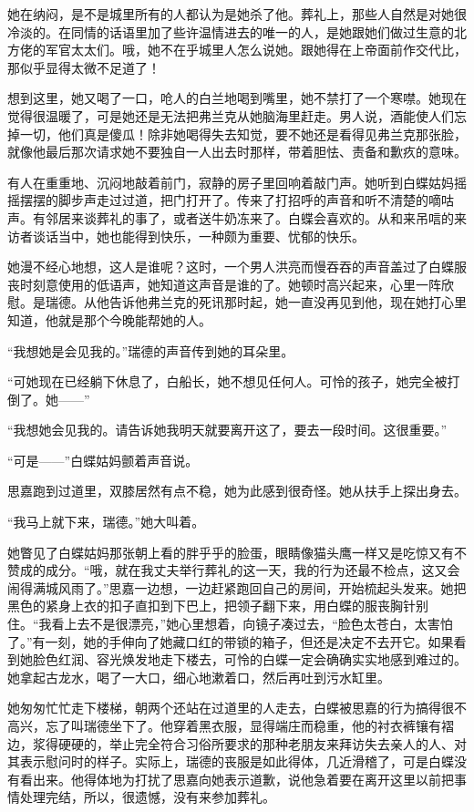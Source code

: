 \par 她在纳闷，是不是城里所有的人都认为是她杀了他。葬礼上，那些人自然是对她很冷淡的。在同情的话语里加了些许温情进去的唯一的人，是她跟她们做过生意的北方佬的军官太太们。哦，她不在乎城里人怎么说她。跟她得在上帝面前作交代比，那似乎显得太微不足道了！
\par 想到这里，她又喝了一口，呛人的白兰地喝到嘴里，她不禁打了一个寒噤。她现在觉得很温暖了，可是她还是无法把弗兰克从她脑海里赶走。男人说，酒能使人们忘掉一切，他们真是傻瓜！除非她喝得失去知觉，要不她还是看得见弗兰克那张脸，就像他最后那次请求她不要独自一人出去时那样，带着胆怯、责备和歉疚的意味。
\par 有人在重重地、沉闷地敲着前门，寂静的房子里回响着敲门声。她听到白蝶姑妈摇摇摆摆的脚步声走过过道，把门打开了。传来了打招呼的声音和听不清楚的嘀咕声。有邻居来谈葬礼的事了，或者送牛奶冻来了。白蝶会喜欢的。从和来吊唁的来访者谈话当中，她也能得到快乐，一种颇为重要、忧郁的快乐。
\par 她漫不经心地想，这人是谁呢？这时，一个男人洪亮而慢吞吞的声音盖过了白蝶服丧时刻意使用的低语声，她知道这声音是谁的了。她顿时高兴起来，心里一阵欣慰。是瑞德。从他告诉他弗兰克的死讯那时起，她一直没再见到他，现在她打心里知道，他就是那个今晚能帮她的人。
\par “我想她是会见我的。”瑞德的声音传到她的耳朵里。
\par “可她现在已经躺下休息了，白船长，她不想见任何人。可怜的孩子，她完全被打倒了。她——”
\par “我想她会见我的。请告诉她我明天就要离开这了，要去一段时间。这很重要。”
\par “可是——”白蝶姑妈颤着声音说。
\par 思嘉跑到过道里，双膝居然有点不稳，她为此感到很奇怪。她从扶手上探出身去。
\par “我马上就下来，瑞德。”她大叫着。
\par 她瞥见了白蝶姑妈那张朝上看的胖乎乎的脸蛋，眼睛像猫头鹰一样又是吃惊又有不赞成的成分。“哦，就在我丈夫举行葬礼的这一天，我的行为还最不检点，这又会闹得满城风雨了。”思嘉一边想，一边赶紧跑回自己的房间，开始梳起头发来。她把黑色的紧身上衣的扣子直扣到下巴上，把领子翻下来，用白蝶的服丧胸针别住。“我看上去不是很漂亮，”她心里想着，向镜子凑过去，“脸色太苍白，太害怕了。”有一刻，她的手伸向了她藏口红的带锁的箱子，但还是决定不去开它。如果看到她脸色红润、容光焕发地走下楼去，可怜的白蝶一定会确确实实地感到难过的。她拿起古龙水，喝了一大口，细心地漱着口，然后再吐到污水缸里。
\par 她匆匆忙忙走下楼梯，朝两个还站在过道里的人走去，白蝶被思嘉的行为搞得很不高兴，忘了叫瑞德坐下了。他穿着黑衣服，显得端庄而稳重，他的衬衣裤镶有褶边，浆得硬硬的，举止完全符合习俗所要求的那种老朋友来拜访失去亲人的人、对其表示慰问时的样子。实际上，瑞德的丧服是如此得体，几近滑稽了，可是白蝶没有看出来。他得体地为打扰了思嘉向她表示道歉，说他急着要在离开这里以前把事情处理完结，所以，很遗憾，没有来参加葬礼。
